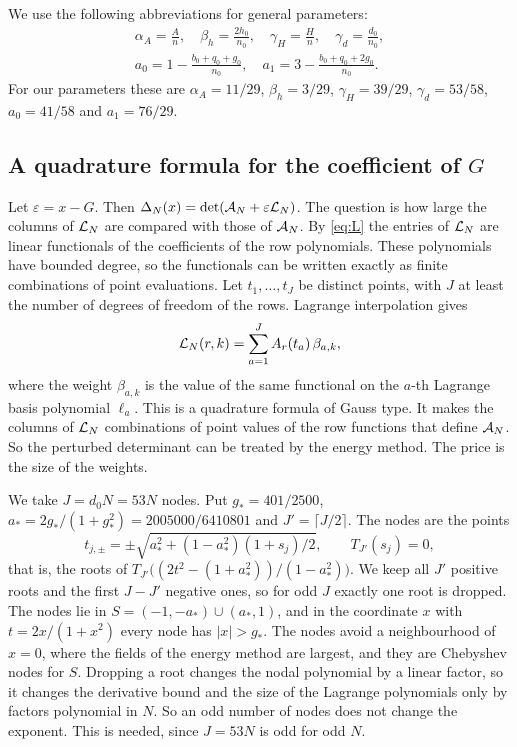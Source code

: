 We use the following abbreviations for general parameters:
\begin{gather*}
 \alpha_A=\frac An,\quad \beta_h=\frac{2h_0}{n_0},\quad \gamma_H=\frac Hn,\quad \gamma_d=\frac{d_0}{n_0},\\
 a_0=1-\frac{b_0+q_0+g_0}{n_0},\quad a_1=3-\frac{b_0+q_0+2g_0}{n_0}.
\end{gather*}
For our parameters these are $\alpha_A=11/29$, $\beta_h=3/29$, $\gamma_H=39/29$, $\gamma_d=53/58$,
$a_0=41/58$ and $a_1=76/29$.

\subsection{A quadrature formula for the coefficient of $G$}\label{ssec:quadrature}
Let $\varepsilon=x-G$. Then $\Delta_N(x)=\det(\mathcal A_N+\varepsilon\mathcal L_N)$. The question is how large the columns
of $\mathcal L_N$ are compared with those of $\mathcal A_N$. By \eqref{eq:L} the entries of $\mathcal L_N$ are linear
functionals of the coefficients of the row polynomials. These polynomials have bounded degree, so the
functionals can be written exactly as finite combinations of point evaluations. Let $t_1,\ldots,t_J$ be
distinct points, with $J$ at least the number of degrees of freedom of the rows. Lagrange interpolation
gives
\begin{equation}\label{eq:quad}
 \mathcal L_N(r,k)=\sum_{a=1}^JA_r(t_a)\,\beta_{a,k},
\end{equation}
where the weight $\beta_{a,k}$ is the value of the same functional on the $a$-th Lagrange basis polynomial
$\ell_a$. This is a quadrature formula of Gauss type. It makes the columns of $\mathcal L_N$ combinations of point
values of the row functions that define $\mathcal A_N$. So the perturbed determinant can be treated by the energy
method. The price is the size of the weights.

We take $J=d_0N=53N$ nodes. Put $g_*=401/2500$, $a_*=2g_*/(1+g_*^2)=2005000/6410801$ and $J'=\lceil J/2\rceil$.
The nodes are the points
\[
 t_{j,\pm}=\pm\sqrt{a_*^2+(1-a_*^2)(1+s_j)/2},\qquad T_{J'}(s_j)=0,
\]
that is, the roots of $T_{J'}\bigl((2t^2-(1+a_*^2))/(1-a_*^2)\bigr)$. We keep all $J'$ positive roots and the
first $J-J'$ negative ones, so for odd $J$ exactly one root is dropped. The nodes lie in
$S=(-1,-a_*)\cup(a_*,1)$, and in the coordinate $x$ with $t=2x/(1+x^2)$ every node has $|x|>g_*$. The nodes
avoid a neighbourhood of $x=0$, where the fields of the energy method are largest, and they are Chebyshev
nodes for $S$. Dropping a root changes the nodal polynomial by a linear factor, so it changes the
derivative bound and the size of the Lagrange polynomials only by factors polynomial in $N$. So an odd
number of nodes does not change the exponent. This is needed, since $J=53N$ is odd for odd $N$.

